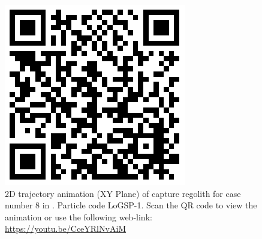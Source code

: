 \begin{figure}[htb]
\centering
\captionsetup{justification=centering}
\includegraphics[scale=0.25]{longest_edge_perturbations/3.2Density_1cmSize/qrcode_8ms_165Azimuth_45SolarPhase.png}
\caption{2D trajectory animation (XY Plane) of capture regolith for case number 8 in . Particle code LoGSP-1. Scan the QR code to view the animation or use the following web-link: \url{https://youtu.be/CceYRlNvAiM}}
\label{fig:LoGSP_1_capture_case_8_2d_trajectory_animation}
\end{figure}
\FloatBarrier



